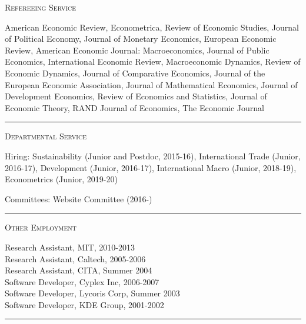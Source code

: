 \documentclass{article}
\begin{document}
\parbox{\textwidth}{
\parbox[t]{0.28\textwidth}{ \raggedright \noindent \textsc{ Refereeing Service } }
\parbox[t]{0.72\textwidth}{ \raggedright

American Economic Review, Econometrica, Review of Economic Studies, Journal of Political Economy, Journal of Monetary Economics, European Economic Review, American Economic Journal: Macroeconomics, Journal of Public Economics, International Economic Review, Macroeconomic Dynamics, Review of Economic Dynamics, Journal of Comparative Economics, Journal of the European Economic Association, Journal of Mathematical Economics, Journal of Development Economics, Review of Economics and Statistics, Journal of Economic Theory, RAND Journal of Economics, The Economic Journal
\vspace{0.27cm}

}
\textcolor{light-gray}{\hrule}
}
\vspace{0.3cm}

\parbox{\textwidth}{
\parbox[t]{0.28\textwidth}{ \raggedright \noindent \textsc{ Departmental Service } }
\parbox[t]{0.72\textwidth}{ \raggedright

Hiring: Sustainability (Junior and Postdoc, 2015-16), International Trade (Junior, 2016-17), Development (Junior, 2016-17), International Macro (Junior, 2018-19), Econometrics (Junior, 2019-20)
\vspace{0.27cm}

Committees: Website Committee (2016-)
\vspace{0.27cm}

}
\textcolor{light-gray}{\hrule}
}
\vspace{0.3cm}

\parbox{\textwidth}{
\parbox[t]{0.28\textwidth}{ \raggedright \noindent \textsc{ Other Employment } }
\parbox[t]{0.72\textwidth}{ \raggedright

Research Assistant, MIT, 2010-2013 \\
Research Assistant, Caltech, 2005-2006 \\
Research Assistant, CITA, Summer 2004 \\
Software Developer, Cyplex Inc, 2006-2007 \\
Software Developer, Lycoris Corp, Summer 2003 \\
Software Developer, KDE Group, 2001-2002
\vspace{0.27cm}

}
\textcolor{light-gray}{\hrule}
}
\vspace{0.3cm}
\end{document}
